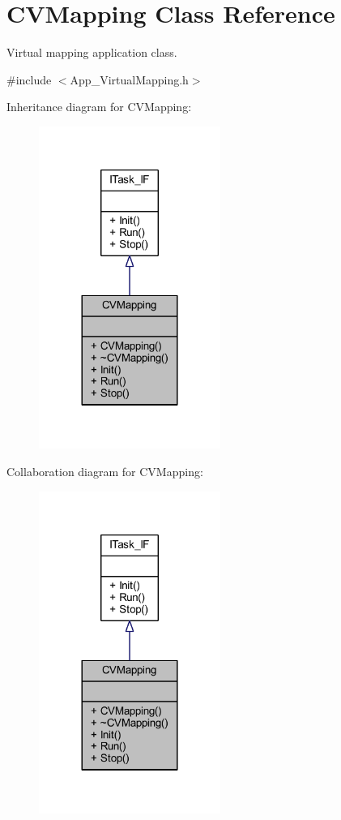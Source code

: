 \hypertarget{class_c_v_mapping}{}\section{C\+V\+Mapping Class Reference}
\label{class_c_v_mapping}


Virtual mapping application class.  




{\ttfamily \#include $<$App\+\_\+\+Virtual\+Mapping.\+h$>$}



Inheritance diagram for C\+V\+Mapping\+:
\nopagebreak
\begin{figure}[H]
\begin{center}
\leavevmode
\includegraphics[width=168pt]{class_c_v_mapping__inherit__graph}
\end{center}
\end{figure}


Collaboration diagram for C\+V\+Mapping\+:
\nopagebreak
\begin{figure}[H]
\begin{center}
\leavevmode
\includegraphics[width=168pt]{class_c_v_mapping__coll__graph}
\end{center}
\end{figure}
